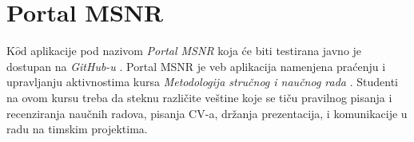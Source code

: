 \documentclass[12pt,oneside]{memoir}
\begin{document}

\chapter{Portal MSNR}
\label{chp:msnr}

\par K$\hat{o}$d aplikacije pod nazivom \emph{Portal MSNR} koja će biti testirana javno je dostupan na \emph{GitHub-u} \cite{msnr-portal}. Portal MSNR je veb aplikacija namenjena praćenju i upravljanju aktivnostima kursa \emph{Metodologija stručnog i naučnog rada} \cite{rad}. Studenti na ovom kursu treba da steknu različite veštine koje se tiču pravilnog pisanja i recenziranja naučnih radova, pisanja CV-a, držanja prezentacija, i komunikacije u radu na timskim projektima. 
\end{document}
